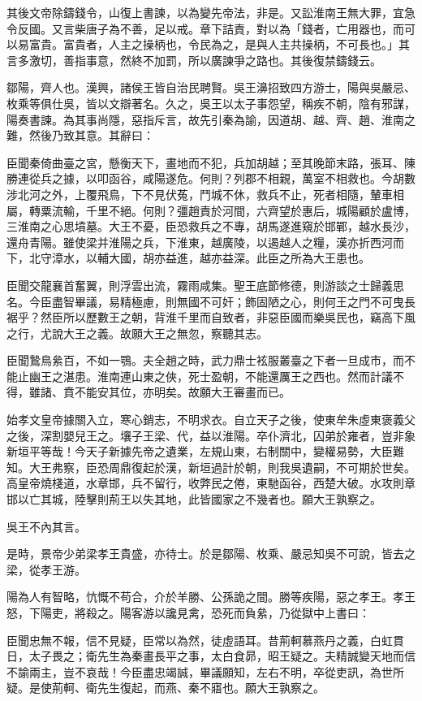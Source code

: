 \begin{pinyinscope}
其後文帝除鑄錢令，山復上書諫，以為變先帝法，非是。又訟淮南王無大罪，宜急令反國。又言柴唐子為不善，足以戒。章下詰責，對以為「錢者，亡用器也，而可以易富貴。富貴者，人主之操柄也，令民為之，是與人主共操柄，不可長也。」其言多激切，善指事意，然終不加罰，所以廣諫爭之路也。其後復禁鑄錢云。

鄒陽，齊人也。漢興，諸侯王皆自治民聘賢。吳王濞招致四方游士，陽與吳嚴忌、枚乘等俱仕吳，皆以文辯著名。久之，吳王以太子事怨望，稱疾不朝，陰有邪謀，陽奏書諫。為其事尚隱，惡指斥言，故先引秦為諭，因道胡、越、齊、趙、淮南之難，然後乃致其意。其辭曰：

臣聞秦倚曲臺之宮，懸衡天下，畫地而不犯，兵加胡越；至其晚節末路，張耳、陳勝連從兵之據，以叩函谷，咸陽遂危。何則？列郡不相親，萬室不相救也。今胡數涉北河之外，上覆飛鳥，下不見伏菟，鬥城不休，救兵不止，死者相隨，輦車相屬，轉粟流輸，千里不絕。何則？彊趙責於河間，六齊望於惠后，城陽顧於盧博，三淮南之心思墳墓。大王不憂，臣恐救兵之不專，胡馬遂進窺於邯鄲，越水長沙，還舟青陽。雖使梁并淮陽之兵，下淮東，越廣陵，以遏越人之糧，漢亦折西河而下，北守漳水，以輔大國，胡亦益進，越亦益深。此臣之所為大王患也。

臣聞交龍襄首奮翼，則浮雲出流，霧雨咸集。聖王底節修德，則游談之士歸義思名。今臣盡智畢議，易精極慮，則無國不可奸；飾固陋之心，則何王之門不可曳長裾乎？然臣所以歷數王之朝，背淮千里而自致者，非惡臣國而樂吳民也，竊高下風之行，尤說大王之義。故願大王之無忽，察聽其志。

臣聞鷙鳥絫百，不如一鶚。夫全趙之時，武力鼎士袨服叢臺之下者一旦成市，而不能止幽王之湛患。淮南連山東之俠，死士盈朝，不能還厲王之西也。然而計議不得，雖諸、賁不能安其位，亦明矣。故願大王審畫而已。

始孝文皇帝據關入立，寒心銷志，不明求衣。自立天子之後，使東牟朱虛東褒義父之後，深割嬰兒王之。壤子王梁、代，益以淮陽。卒仆濟北，囚弟於雍者，豈非象新垣平等哉！今天子新據先帝之遺業，左規山東，右制關中，變權易勢，大臣難知。大王弗察，臣恐周鼎復起於漢，新垣過計於朝，則我吳遺嗣，不可期於世矣。高皇帝燒棧道，水章邯，兵不留行，收弊民之倦，東馳函谷，西楚大破。水攻則章邯以亡其城，陸擊則荊王以失其地，此皆國家之不幾者也。願大王孰察之。

吳王不內其言。

是時，景帝少弟梁孝王貴盛，亦待士。於是鄒陽、枚乘、嚴忌知吳不可說，皆去之梁，從孝王游。

陽為人有智略，忼慨不苟合，介於羊勝、公孫詭之間。勝等疾陽，惡之孝王。孝王怒，下陽吏，將殺之。陽客游以讒見禽，恐死而負絫，乃從獄中上書曰：

臣聞忠無不報，信不見疑，臣常以為然，徒虛語耳。昔荊軻慕燕丹之義，白虹貫日，太子畏之；衛先生為秦畫長平之事，太白食昴，昭王疑之。夫精誠變天地而信不諭兩主，豈不哀哉！今臣盡忠竭誠，畢議願知，左右不明，卒從吏訊，為世所疑。是使荊軻、衛先生復起，而燕、秦不寤也。願大王孰察之。


\end{pinyinscope}
